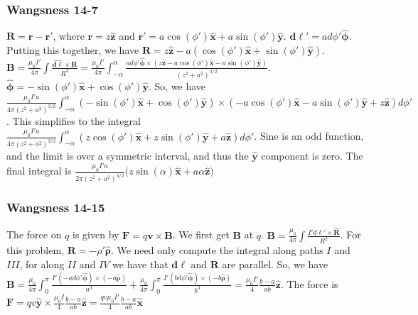 \documentclass[oneside]{book}
\theoremstyle{definition}
\newcommand*\B[1]{\mathbf{#1}}
\newcommand*\Bh[1]{\mathbf{\hat{#1}}}
\begin{document}
\begin{figure}[!h]
  \centering
\end{figure}

\subsubsection{Wangsness 14-7}

$\B{R} = \B{r}-\B{r}'$, where $\B{r} = z\Bh{z}$ and $\B{r}' = a\cos(\phi')\Bh{x}+a\sin(\phi')\Bh{y}$. $\B{d\ell}' = ad\phi' \Bh{\phi}$. Putting this together, we have $\B{R} = z\Bh{z} - a(\cos(\phi')\Bh{x}+\sin(\phi')\Bh{y})$. $\B{B} = \frac{\mu_0 I'}{4\pi}\int \frac{\Bh{d\ell}\times \B{R}}{R^3} = \frac{\mu_0I'}{4\pi} \int_{-\alpha}^{\alpha} \frac{ad\phi' \Bh{\phi}\times (z\Bh{z}-a\cos(\phi')\Bh{x}-a\sin(\phi')\Bh{y})}{(z^2+a^2)^{3/2}}$. $\Bh{\phi} = -\sin(\phi')\Bh{x}+\cos(\phi')\Bh{y}$. So, we have $\frac{\mu_0 I'a}{4\pi(z^2+a^2)^{3/2}}\int_{-\alpha}^{\alpha} (-\sin(\phi')\Bh{x}+\cos(\phi')\Bh{y})\times (-a\cos(\phi')\Bh{x}-a\sin(\phi')\Bh{y}+z\Bh{z})d\phi'$. This simplifies to the integral $\frac{\mu_0 I'a}{4\pi (z^2+a^2)^{3/2}}\int_{-\alpha}^{\alpha} (z\cos(\phi')\Bh{x}+z\sin(\phi')\Bh{y}+a\Bh{z})d\phi'$. Sine is an odd function, and the limit is over a symmetric interval, and thus the $\Bh{y}$ component is zero. The final integral is $\frac{\mu_0 I' a}{2\pi (z^2+a^2)^{3/2}}\big(z\sin(\alpha)\Bh{x}+a\alpha \Bh{z}\big)$

\subsubsection{Wangsness 14-15}

The force on $q$ is given by $\B{F} = q\B{v}\times \B{B}$. We first get $\B{B}$ at $q$. $\B{B} = \frac{\mu_0}{4\pi} \int \frac{I' d\ell' \times \Bh{R}}{R^2}$. For this problem, $\B{R} = -\rho' \Bh{\rho}$. We need only compute the integral along paths $I$ and $III$, for along $II$ and $IV$ we have that $\B{d\ell}$ and $\B{R}$ are parallel. So, we have $\B{B} = \frac{\mu_0}{4\pi} \int_{0}^{\pi} \frac{I'(-ad\phi' \Bh{\phi})\times (-a\Bh{\rho})}{a^3}+ \frac{\mu_0}{4\pi} \int_{0}^{\pi} \frac{I'(bd\phi' \Bh{\phi})\times (-b\Bh{\rho})}{b^3} = \frac{\mu_0 I'}{4} \frac{b-a}{ab} \Bh{z}$. The force is $\B{F} = qv\Bh{y} \times \frac{\mu_0 I}{4} \frac{b-a}{ab} \Bh{z} = \frac{qv\mu_0 I'}{4} \frac{b-a}{ab} \Bh{x}$

\begin{figure}[!h]
  \centering
\end{figure}
\end{document}

